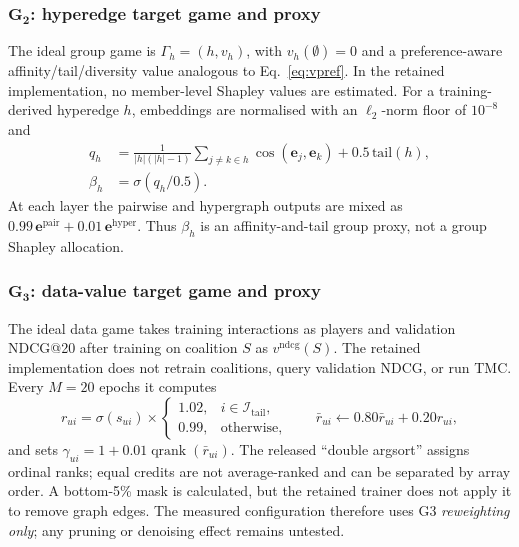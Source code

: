 \documentclass[a4paper,fleqn,longmktitle]{cas-dc}
\begin{document}
\subsubsection{$\mathbf{G_2}$: hyperedge target game and proxy}

The ideal group game is $\Gamma_h=(h,v_h)$, with $v_h(\emptyset)=0$ and a
preference-aware affinity/tail/diversity value analogous to
Eq.~\eqref{eq:vpref}. In the retained implementation, no member-level Shapley
values are estimated. For a training-derived hyperedge $h$, embeddings are
normalised with an $\ell_2$-norm floor of $10^{-8}$ and
\begin{align}
q_h &= \frac{1}{|h|(|h|-1)}\sum_{j\ne k\in h}
       \cos(\mathbf e_j,\mathbf e_k)
       +0.5\,\mathrm{tail}(h),\label{eq:g2proxy}\\
\beta_h&=\sigma(q_h/0.5).\label{eq:g2weight}
\end{align}
At each layer the pairwise and hypergraph outputs are mixed as
$0.99\,\mathbf e^{\mathrm{pair}}+0.01\,\mathbf e^{\mathrm{hyper}}$.
Thus $\beta_h$ is an affinity-and-tail group proxy, not a group Shapley
allocation.

\subsubsection{$\mathbf{G_3}$: data-value target game and proxy}

The ideal data game takes training interactions as players and validation
NDCG@20 after training on coalition $S$ as $v^{\mathrm{ndcg}}(S)$. The
retained implementation does not retrain coalitions, query validation NDCG, or
run TMC. Every $M=20$ epochs it computes
\begin{equation}
r_{ui}=\sigma(s_{ui})\times
\begin{cases}1.02,&i\in\mathcal I_{\mathrm{tail}},\\0.99,&\text{otherwise},
\end{cases}
\qquad
\bar r_{ui}\leftarrow0.80\bar r_{ui}+0.20r_{ui},
\label{eq:g3proxy}
\end{equation}
and sets $\gamma_{ui}=1+0.01\operatorname{qrank}(\bar r_{ui})$. The released
``double argsort'' assigns ordinal ranks; equal credits are not average-ranked
and can be separated by array order.
A bottom-5\% mask is calculated, but the retained trainer does not apply it to
remove graph edges. The measured configuration therefore uses G3
\emph{reweighting only}; any pruning or denoising effect remains untested.
\end{document}
